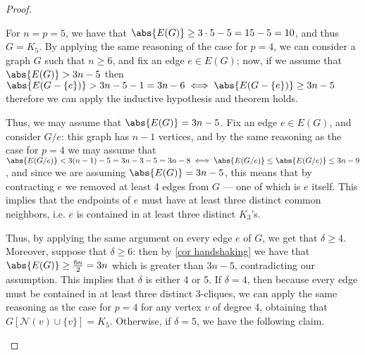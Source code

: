 \documentclass[a4paper, 12pt]{report}
\begin{document}
\begin{proof}
\begin{itemize}
                For $n = p = 5$, we have that $\abs{E(G)} \ge 3 \cdot 5 - 5 = 15 - 5 = 10$, and thus $G = K_5$. By applying the same reasoning of the case for $p = 4$, we can consider a graph $G$ such that $n \ge 6$, and fix an edge $e \in E(G)$; now, if we assume that $\abs{E(G)}> 3n - 5$ then $\abs{E(G - \{e\})} > 3n - 5 - 1 = 3n - 6 \iff \abs{E(G - \{e\})} \ge 3n - 5$ therefore we can apply the inductive hypothesis and theorem holds.

                Thus, we may assume that $\abs{E(G)} = 3n - 5$. Fix an edge $e \in E(G)$, and consider $G/e$: this graph has $n - 1$ vertices, and by the same reasoning as the case for $p = 4$ we may assume that $\abs{E(G/e)} < 3(n - 1) - 5 = 3n -3 -5 = 3n - 8 \iff \abs{E(G/e)} \le \abs{E(G/e)} \le 3n - 9$, and since we are assuming $\abs{E(G)} = 3n - 5$, this means that by contracting $e$ we removed at least 4 edges from $G$ --- one of which is $e$ itself. This implies that the endpoints of $e$ must have at least three distinct common neighbors, i.e. $e$ is contained in at least three distinct $K_3$'s.

                Thus, by applying the same argument on every edge $e$ of $G$, we get that $\delta \ge 4$. Moreover, suppose that $\delta \ge 6$: then by \cref{cor handshaking} we have that $\abs{E(G)} \ge \tfrac{6n}{2} = 3n$ which is greater than $3n - 5$, contradicting our assumption. This implies that $\delta$ is either 4 or 5. If $\delta = 4$, then because every edge must be contained in at least three distinct 3-cliques, we can apply the same reasoning as the case for $p = 4$ for any vertex $v$ of degree 4, obtaining that $G[\mathcal N(v) \cup \{v\}] = K_5$. Otherwise, if $\delta = 5$, we have the following claim.

\end{itemize}
\end{proof}
\end{document}
